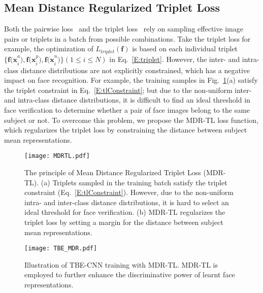 \documentclass[10pt,journal,cspaper,compsoc]{IEEEtran}
\begin{document}
\subsection{Mean Distance Regularized Triplet Loss}
Both the pairwise loss~\cite{sun2014deep} and the triplet loss~\cite{hoffer2015deep,schroff2015facenet} rely on sampling effective image pairs or triplets in a batch from possible combinations.
Take the triplet loss for example, the optimization of $L_{triplet}(\mathbf{f})$ is based on each individual triplet $\{\mathbf{f(x}_{i}^a),\mathbf{f(x}_{i}^p),\mathbf{f(x}_{i}^n)\}(1\leq{i}\leq{N})$ in Eq.~\ref{E:triplet}.
However, the inter- and intra-class distance distributions are not explicitly constrained, which has a negative impact on face recognition.
For example, the training samples in Fig.~\ref{fig:MDRTL}(a) satisfy the triplet constraint in Eq.~\ref{E:tlConstraint};
but due to the non-uniform inter- and intra-class distance distributions,
it is difficult to find an ideal threshold in face verification to determine whether a pair of face images belong to the same subject or not.
To overcome this problem, we propose the MDR-TL loss function,
which regularizes the triplet loss by constraining the distance between subject mean representations.

\begin{figure}
\centering
\texttt{[image: MDRTL.pdf]}
\caption{The principle of Mean Distance Regularized Triplet Loss (MDR-TL).
(a) Triplets sampled in the training batch satisfy the triplet constraint (Eq.~\ref{E:tlConstraint}).
However, due to the non-uniform intra- and inter-class distance distributions,
it is hard to select an ideal threshold for face verification.
(b) MDR-TL regularizes the triplet loss by setting a margin for the distance between subject mean representations.}
\label{fig:MDRTL}
\end{figure}


\begin{figure}
\centering
\texttt{[image: TBE\_MDR.pdf]}
\caption{Illustration of TBE-CNN training with MDR-TL.
MDR-TL is employed to further enhance the discriminative power of learnt face representations.}
\label{fig:TBE_MDR}
\end{figure}
\end{document}
